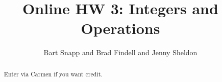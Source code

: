 \documentclass[handout,space,nooutcomes]{xourse}
\title{Online HW 3: Integers and Operations}
\author{Bart Snapp and Brad Findell and Jenny Sheldon}
\begin{document}
\begin{abstract}
Enter via Carmen if you want credit.   
\end{abstract}
\maketitle

{}
\end{document}

